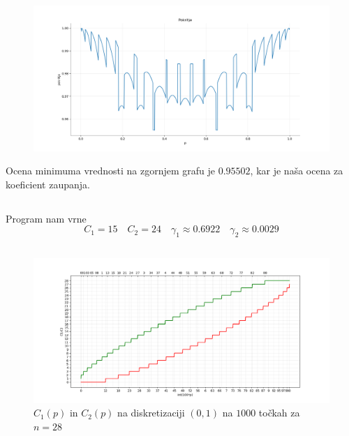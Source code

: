 \documentclass[ letterpaper, titlepage, fleqn]{article}
\begin{document}
\subsection{}
\begin{center}
\begin{figure}[h]
\includegraphics[width=18cm]{graphics/Pokritje.png}
\end{figure}
\end{center}
Ocena minimuma vrednosti na zgornjem grafu je $0.95502$, kar je naša ocena za koeficient zaupanja.

\subsection{}
Program nam vrne
$$C_1 = 15 \quad C_2 = 24 \quad \gamma_1 \approx 0.6922 \quad \gamma_2 \approx 0.0029$$

\subsection{}
\begin{center}
\begin{figure}[h]
\includegraphics[width=18cm]{graphics/C1C2_28.png}
\caption{$C_1(p)$ in $C_2(p)$  na diskretizaciji $(0,1)$ na $1000$ točkah za $n=28$}
\end{figure}
\end{center}
\end{document}
